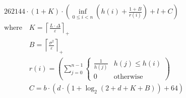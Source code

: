 \[\begin{aligned} &262144 \cdot \left(1 + K\right) \cdot \left(\inf_{0\le i<n}\left(h\left(i\right) + \frac{1 + B}{r\left(i\right)}\right) + l + C\right) \\ &\text{where}\quad K = \left\lceil \frac{L \cdot \Delta}{\varepsilon} \right\rceil_{+} \\ &\phantom{\text{where}\quad} B = \left\lceil \frac{\sigma^{2}}{\varepsilon} \right\rceil_{+} \\ &\phantom{\text{where}\quad} r\left(i\right) = \left(\sum_{j=0}^{n-1} \begin{cases} \frac{1}{h\left(j\right)} & h\left(j\right) \leq h\left(i\right) \\ 0 & \mathrm{otherwise} \end{cases}\right) \\ &\phantom{\text{where}\quad} C = b \cdot \left(d \cdot \left(1 + \log_{2}\left(2 + d + K + B\right)\right) + 64\right)\end{aligned}\]
